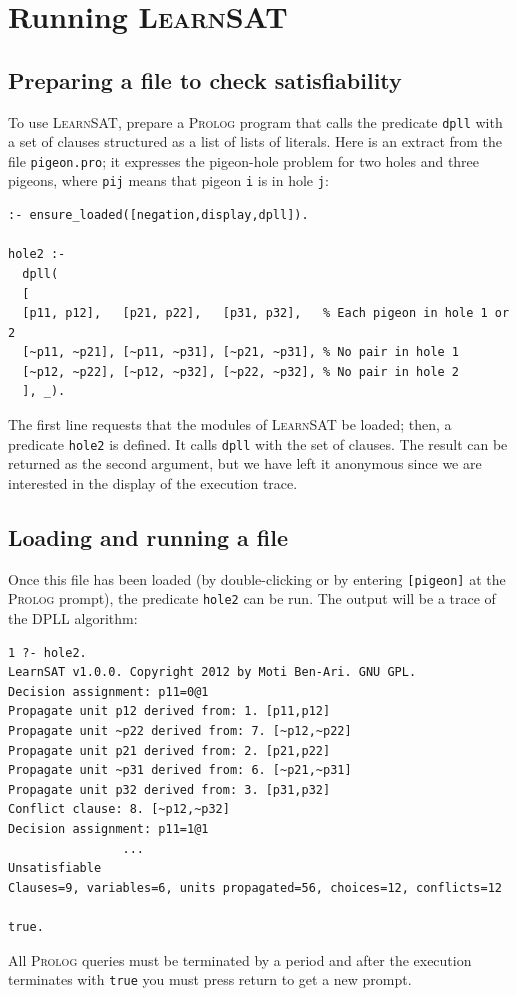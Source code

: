 \documentclass[11pt]{article}
\newcommand*{\p}[1]{\textup{\texttt{#1}}}
\newcommand*{\ls}{\textsc{LearnSAT}}
\newcommand*{\pl}{\textsc{Prolog}}
\begin{document}
\section{Running \ls}

\subsection{Preparing a file to check satisfiability}

To use \ls{}, prepare a \pl{} program that calls the predicate \p{dpll}
with a set of clauses structured as a list of lists of literals. Here is
an extract from the file \p{pigeon.pro}; it expresses the pigeon-hole
problem for two holes and three pigeons, where \p{pij} means that pigeon
\p{i} is in hole \p{j}:

\begin{verbatim}
:- ensure_loaded([negation,display,dpll]).

hole2 :-
  dpll(
  [
  [p11, p12],   [p21, p22],   [p31, p32],   % Each pigeon in hole 1 or 2 
  [~p11, ~p21], [~p11, ~p31], [~p21, ~p31], % No pair in hole 1
  [~p12, ~p22], [~p12, ~p32], [~p22, ~p32], % No pair in hole 2
  ], _).
\end{verbatim}

The first line requests that the modules of \ls{} be loaded; then, a
predicate \p{hole2} is defined. It calls \p{dpll} with the set of
clauses. The result can be returned as the second argument, but we have
left it anonymous since we are interested in the display of the
execution trace.

\subsection{Loading and running a file}

Once this file has been loaded (by double-clicking or by entering
\p{[pigeon]} at the \pl{} prompt), the predicate \p{hole2} can be run.
The output will be a trace of the DPLL algorithm:

\begin{verbatim}
1 ?- hole2.
LearnSAT v1.0.0. Copyright 2012 by Moti Ben-Ari. GNU GPL.
Decision assignment: p11=0@1
Propagate unit p12 derived from: 1. [p11,p12]
Propagate unit ~p22 derived from: 7. [~p12,~p22]
Propagate unit p21 derived from: 2. [p21,p22]
Propagate unit ~p31 derived from: 6. [~p21,~p31]
Propagate unit p32 derived from: 3. [p31,p32]
Conflict clause: 8. [~p12,~p32]
Decision assignment: p11=1@1
                ...
Unsatisfiable
Clauses=9, variables=6, units propagated=56, choices=12, conflicts=12

true.
\end{verbatim}
All \pl{} queries must be terminated by a period and after the execution
terminates with \p{true} you must press return to get a new prompt.
\end{document}
